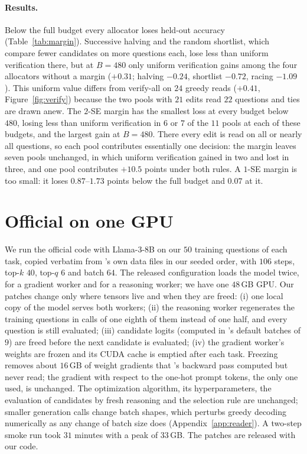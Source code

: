 \paragraph{Results.} Below the full budget every allocator loses held-out accuracy
(Table~\ref{tab:margin}). Successive halving and the random shortlist, which compare fewer
candidates on more questions each, lose less than uniform verification there, but at $B=480$ only
uniform verification gains among the four allocators without a margin ($+0.31$; halving $-0.24$,
shortlist $-0.72$, racing $-1.09$). This
uniform value differs from verify-all on $24$ greedy reads ($+0.41$, Figure~\ref{fig:verify})
because the two pools with $21$ edits read $22$ questions and ties are drawn anew. The $2$-SE margin
has the smallest loss at every budget below $480$, losing less than uniform verification in $6$ or
$7$ of the $11$ pools at each of these budgets, and the largest gain at $B=480$. There every edit is
read on all or nearly all questions, so each pool contributes essentially one decision: the margin
leaves seven pools unchanged, in which uniform verification gained in two and lost in three, and
one pool contributes $+10.5$ points under both rules. A $1$-SE margin is too small: it loses
$0.87$--$1.73$ points below the full budget and $0.07$ at it.



\section{Official \greater{} on one GPU}
\label{app:greater}
We run the official \greater{} code with Llama-3-8B on our $50$ training questions of each task,
copied verbatim from \greater{}'s own data files in our seeded order, with $106$ steps, top-$k$
$40$, top-$q$ $6$ and batch $64$. The released configuration loads the model twice, for a
gradient worker and for a reasoning worker; we have one $48$\,GB GPU.
Our patches change only where tensors live and when they are freed: (i) one local copy of the
model serves both workers; (ii) the reasoning worker regenerates the training questions in calls
of one eighth of them instead of one half, and every question is still evaluated; (iii) candidate
logits (computed in \greater{}'s default batches of $9$) are freed before the next candidate is
evaluated; (iv) the gradient
worker's weights are frozen and its CUDA cache is emptied after each task. Freezing removes about
$16$\,GB of weight gradients that \greater{}'s backward pass computed but never read; the gradient
with respect to the one-hot prompt tokens, the only one used, is unchanged. The optimization
algorithm, its hyperparameters, the evaluation of candidates by fresh reasoning and the selection
rule are unchanged; smaller generation calls change batch shapes, which perturbs greedy decoding
numerically as any change of batch size does (Appendix~\ref{app:reader}). A two-step smoke run
took $31$ minutes with a peak of $33$\,GB. The patches are released with our code.

